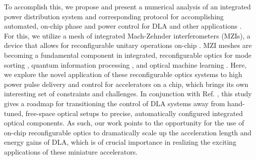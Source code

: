 To accomplish this, we propose and present a numerical analysis of an integrated power distribution system and corresponding protocol for accomplishing automated, on-chip phase and power control for DLA and other applications \cite{hughes_reconfigurable_2019}. For this, we utilize a mesh of integrated Mach-Zehnder interferometers (MZIs), a device that allows for reconfigurable unitary operations on-chip \cite{miller_self-configuring_2013,miller_perfect_2015}.  MZI meshes are becoming a fundamental component in integrated, reconfigurable optics for mode sorting \cite{miller_sorting_2015,annoni_unscrambling_2017,miller_setting_2017,miller_self-configuring_2018}, quantum information processing \cite{harris_quantum_2017,metcalf_multiphoton_2013,aspuru-guzik_photonic_2012,obrien_photonic_2009}, and optical machine learning \cite{shen_deep_2017, hughes2018training}.  Here, we explore the novel application of these reconfigurable optics systems to high power pulse delivery and control for accelerators on a chip, which brings its own interesting set of constraints and challenges.  In conjunction with Ref. \cite{hughes_-chip_2018}, this study gives a roadmap for transitioning the control of DLA systems away from hand-tuned, free-space optical setups to precise, automatically configured integrated optical components.  As such, our work points to the opportunity for the use of on-chip reconfigurable optics to dramatically scale up the acceleration length and energy gains of DLA, which is of crucial importance in realizing the exciting applications of these miniature accelerators.


